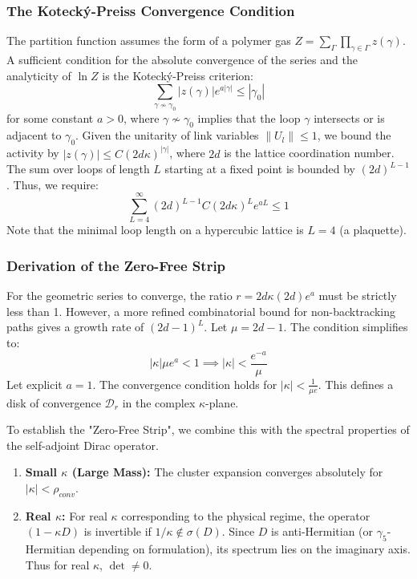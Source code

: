 \subsubsection{The Koteck\'y-Preiss Convergence Condition}
The partition function assumes the form of a polymer gas $Z = \sum_{\Gamma} \prod_{\gamma \in \Gamma} z(\gamma)$. A sufficient condition for the absolute convergence of the series and the analyticity of $\ln Z$ is the Koteck\'y-Preiss criterion:
\[
\sum_{\gamma \nsim \gamma_0} |z(\gamma)| e^{a |\gamma|} \le |\gamma_0|
\]
for some constant $a > 0$, where $\gamma \nsim \gamma_0$ implies that the loop $\gamma$ intersects or is adjacent to $\gamma_0$.
Given the unitarity of link variables $\|U_l\| \le 1$, we bound the activity by $|z(\gamma)| \le C (2d \kappa)^{|\gamma|}$, where $2d$ is the lattice coordination number. The sum over loops of length $L$ starting at a fixed point is bounded by $(2d)^{L-1}$. Thus, we require:
\[
\sum_{L=4}^\infty (2d)^{L-1} C (2d \kappa)^L e^{a L} \le 1
\]
Note that the minimal loop length on a hypercubic lattice is $L=4$ (a plaquette).

\subsubsection{Derivation of the Zero-Free Strip}
For the geometric series to converge, the ratio $r = 2d \kappa (2d) e^a$ must be strictly less than 1. However, a more refined combinatorial bound for non-backtracking paths gives a growth rate of $(2d-1)^L$. Let $\mu = 2d-1$. The condition simplifies to:
\[
|\kappa| \mu e^a < 1 \implies |\kappa| < \frac{e^{-a}}{\mu}
\]
Let explicit $a=1$. The convergence condition holds for $|\kappa| < \frac{1}{\mu e}$.
This defines a disk of convergence $\mathcal{D}_r$ in the complex $\kappa$-plane.

To establish the "Zero-Free Strip", we combine this with the spectral properties of the self-adjoint Dirac operator.
\begin{enumerate}
    \item \textbf{Small $\kappa$ (Large Mass):} The cluster expansion converges absolutely for $|\kappa| < \rho_{conv}$.
    \item \textbf{Real $\kappa$:} For real $\kappa$ corresponding to the physical regime, the operator $(1-\kappa D)$ is invertible if $1/\kappa \notin \sigma(D)$. Since $D$ is anti-Hermitian (or $\gamma_5$-Hermitian depending on formulation), its spectrum lies on the imaginary axis. Thus for real $\kappa$, $\det \neq 0$.
\end{enumerate}

